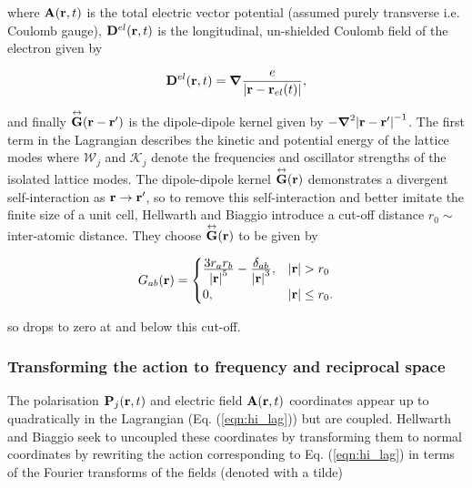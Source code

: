 where $\vb{A}(\vb{r}, t)$ is the total electric vector potential (assumed purely transverse i.e. Coulomb gauge), $\vb{D}^{el}(\vb{r}, t)$ is the longitudinal, un-shielded Coulomb field of the electron given by

\begin{equation}
    \vb{D}^{el}(\vb{r}, t) = \grad \frac{e}{\abs{\vb{r} - \vb{r}_{el}(t)}},
\end{equation}

and finally $\overset{\leftrightarrow}{\vb{G}}(\vb{r} - \vb{r'})$ is the dipole-dipole kernel given by $-\grad^2 \abs{\vb{r} - \vb{r}'}^{-1}$. The first term in the Lagrangian describes the kinetic and potential energy of the lattice modes where $\mathcal{W}_j$ and  $\mathcal{K}_j$ denote the frequencies and oscillator strengths of the isolated lattice modes. The dipole-dipole kernel $\overset{\leftrightarrow}{\vb{G}}(\vb{r})$ demonstrates a divergent self-interaction as $\vb{r} \to \vb{r'}$, so to remove this self-interaction and better imitate the finite size of a unit cell, Hellwarth and Biaggio introduce a cut-off distance $r_0 \sim$ inter-atomic distance. They choose $\overset{\leftrightarrow}{\vb{G}}(\vb{r})$ to be given by

\begin{equation}
    G_{ab}(\vb{r}) = 
    \begin{cases}
        \frac{\displaystyle 3r_a r_b}{\displaystyle \abs{\vb{r}}^5} - \frac{\displaystyle \delta_{ab}}{\displaystyle \abs{\vb{r}}^3}, & \abs{\vb{r}} > r_0 \\
        0, & \abs{\vb{r}} \leq r_0.
    \end{cases}
\end{equation}

so drops to zero at and below this cut-off.

\subsubsection{Transforming the action to frequency and reciprocal space}
\label{subsubsec:2-3-3-2}

The polarisation $\vb{P}_j(\vb{r}, t)$ and electric field $\vb{A}(\vb{r}, t)$ coordinates appear up to quadratically in the Lagrangian (Eq. (\ref{eqn:hi_lag})) but are coupled. Hellwarth and Biaggio seek to uncoupled these coordinates by transforming them to normal coordinates by rewriting the action corresponding to Eq. (\ref{eqn:hi_lag}) in terms of the Fourier transforms of the fields (denoted with a tilde)

